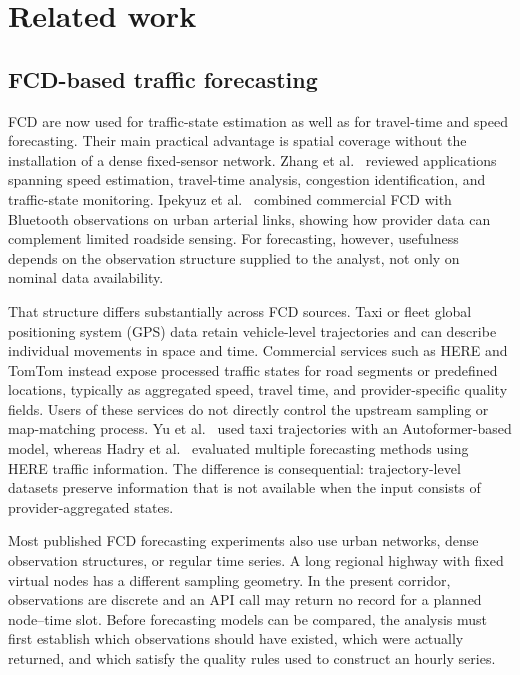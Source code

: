 \documentclass[pdflatex,sn-basic,Numbered]{sn-jnl}
\begin{document}
\section{Related work}
\label{sec:related}

\subsection{FCD-based traffic forecasting}
\label{subsec:fcd-related}

FCD are now used for traffic-state estimation as well as for travel-time and speed forecasting. Their main practical advantage is spatial coverage without the installation of a dense fixed-sensor network. Zhang et al.~\cite{Zhang2025FCD} reviewed applications spanning speed estimation, travel-time analysis, congestion identification, and traffic-state monitoring. Ipekyuz et al.~\cite{Ipekyuz2025FCD} combined commercial FCD with Bluetooth observations on urban arterial links, showing how provider data can complement limited roadside sensing. For forecasting, however, usefulness depends on the observation structure supplied to the analyst, not only on nominal data availability.

That structure differs substantially across FCD sources. Taxi or fleet global positioning system (GPS) data retain vehicle-level trajectories and can describe individual movements in space and time. Commercial services such as HERE and TomTom instead expose processed traffic states for road segments or predefined locations, typically as aggregated speed, travel time, and provider-specific quality fields. Users of these services do not directly control the upstream sampling or map-matching process. Yu et al.~\cite{Yu2024AutoformerFCD} used taxi trajectories with an Autoformer-based model, whereas Hadry et al.~\cite{Hadry2025TrafficForecasting} evaluated multiple forecasting methods using HERE traffic information. The difference is consequential: trajectory-level datasets preserve information that is not available when the input consists of provider-aggregated states.

Most published FCD forecasting experiments also use urban networks, dense observation structures, or regular time series. A long regional highway with fixed virtual nodes has a different sampling geometry. In the present corridor, observations are discrete and an API call may return no record for a planned node--time slot. Before forecasting models can be compared, the analysis must first establish which observations should have existed, which were actually returned, and which satisfy the quality rules used to construct an hourly series.
\end{document}
